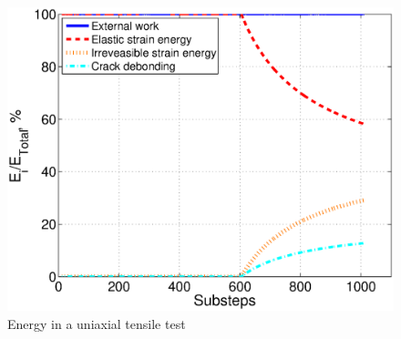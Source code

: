 \documentclass[preprint,review,12pt]{elsarticle}
\begin{document}
\begin{enumerate}
\begin{figure}[htbp]
{\begin{minipage}[b]{0.48\textwidth}
\includegraphics[width=\textwidth]{MRC/simple/tensile/energypercentage.eps}
\end{minipage}}
\caption{Energy in a uniaxial tensile test}
\label{fig:TensileEnergy}
\end{figure}


\end{enumerate}
\end{document}
